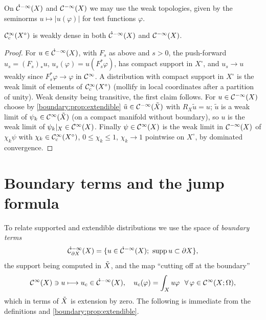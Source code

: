 On $\dot{\mathcal{C}}^{-\infty}(X)$ and $\mathcal{C}^{-\infty}(X)$ we may use the weak topologies, given by the seminorms
$u\mapsto|u(\varphi)|$ for test functions $\varphi$.

\begin{lemma}\label{boundary:lem:weak-density}
$\mathcal{C}^\infty_{\mathrm{c}}(X^\circ)$ is weakly dense in both $\dot{\mathcal{C}}^{-\infty}(X)$ and $\mathcal{C}^{-\infty}(X)$.
\end{lemma}
\begin{proof}
For $u\in\dot{\mathcal{C}}^{-\infty}(X)$, with $F_s$ as above and $s>0$, the push-forward $u_s=(F_s)_*u$,
$u_s(\varphi)=u(F_s^*\varphi)$, has compact support in $X^\circ$, and $u_s\to u$
weakly since $F_s^*\varphi\to\varphi$ in $\mathcal{C}^\infty$. A distribution with compact support
in $X^\circ$ is the weak limit of elements of $\mathcal{C}^\infty_{\mathrm{c}}(X^\circ)$ (mollify in local
coordinates after a partition of unity). Weak density being transitive, the first
claim follows. For $u\in\mathcal{C}^{-\infty}(X)$ choose by \cref{boundary:prop:extendible}
$\tilde u\in\mathcal{C}^{-\infty}(\tilde{X})$ with $R_X\tilde u=u$; $\tilde u$ is a weak limit of
$\psi_k\in\mathcal{C}^\infty(\tilde{X})$ (on a compact manifold without boundary), so $u$ is the weak limit
of $\psi_k|_X\in\mathcal{C}^\infty(X)$. Finally $\psi\in\mathcal{C}^\infty(X)$ is the weak limit in $\mathcal{C}^{-\infty}(X)$ of
$\chi_k\psi$ with $\chi_k\in\mathcal{C}^\infty_{\mathrm{c}}(X^\circ)$, $0\le\chi_k\le1$, $\chi_k\to1$ pointwise
on $X^\circ$, by dominated convergence.
\end{proof}

\section{Boundary terms and the jump formula}\label{boundary:sec:jump}

To relate supported and extendible distributions we use the space of
\emph{boundary terms}
\begin{equation*}
\dot{\mathcal{C}}^{-\infty}_{\partial X}(X)=\{u\in\dot{\mathcal{C}}^{-\infty}(X);\ \operatorname{supp} u\subset\partial X\},
\end{equation*}
the support being computed in $\tilde{X}$, and the map ``cutting off at the boundary''
\begin{equation*}
\mathcal{C}^\infty(X)\ni u\longmapsto u_c\in\dot{\mathcal{C}}^{-\infty}(X),\quad u_c(\varphi)=\int_Xu\varphi\ \ \forall\,
\varphi\in\mathcal{C}^\infty(X;\Omega),
\end{equation*}
which in terms of $\tilde{X}$ is extension by zero. The following is immediate from the
definitions and \cref{boundary:prop:extendible}.

